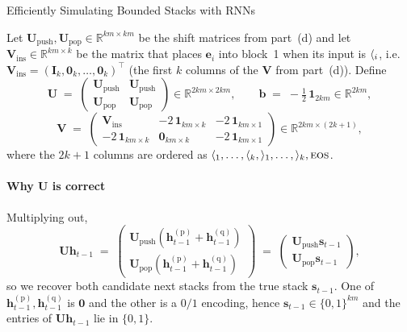 \begin{question}{Efficiently Simulating Bounded Stacks with RNNs}
\begin{subquestion}
    Let $\mathbf{U}_{\text{push}}, \mathbf{U}_{\text{pop}} \in \mathbb{R}^{km\times km}$ be the shift matrices from part~(d) and let $\mathbf{V}_{\text{ins}} \in \mathbb{R}^{km \times k}$ be the matrix that places $\mathbf{e}_i$ into block~1 when its input is $\openBr{i}$, i.e.\ $\mathbf{V}_{\text{ins}} = (\mathbf{I}_k, \mathbf{0}_k, \dots, \mathbf{0}_k)^\top$ (the first $k$ columns of the $\mathbf{V}$ from part~(d)).
    Define
    \[
        \mathbf{U} \;=\; \begin{pmatrix} \mathbf{U}_{\text{push}} & \mathbf{U}_{\text{push}} \\ \mathbf{U}_{\text{pop}} & \mathbf{U}_{\text{pop}} \end{pmatrix} \in \mathbb{R}^{2km \times 2km},
        \qquad
        \mathbf{b} \;=\; -\tfrac{1}{2}\,\mathbf{1}_{2km} \in \mathbb{R}^{2km},
    \]
    \[
        \mathbf{V} \;=\;
        \begin{pmatrix}
            \mathbf{V}_{\text{ins}} & -2\,\mathbf{1}_{km \times k} & -2\,\mathbf{1}_{km \times 1} \\[2pt]
            -2\,\mathbf{1}_{km \times k} & \mathbf{0}_{km \times k} & -2\,\mathbf{1}_{km \times 1}
        \end{pmatrix} \in \mathbb{R}^{2km \times (2k+1)},
    \]
    where the $2k+1$ columns are ordered as $\openBr{1}, \dots, \openBr{k}, \closeBr{1}, \dots, \closeBr{k}, \eos$.

    \paragraph{Why $\mathbf{U}$ is correct} Multiplying out,
    \[
        \mathbf{U}\mathbf{h}_{t-1} \;=\; \begin{pmatrix} \mathbf{U}_{\text{push}}(\mathbf{h}_{t-1}^{(\text{p})} + \mathbf{h}_{t-1}^{(\text{q})}) \\ \mathbf{U}_{\text{pop}}(\mathbf{h}_{t-1}^{(\text{p})} + \mathbf{h}_{t-1}^{(\text{q})}) \end{pmatrix} \;=\; \begin{pmatrix} \mathbf{U}_{\text{push}}\mathbf{s}_{t-1} \\ \mathbf{U}_{\text{pop}}\mathbf{s}_{t-1} \end{pmatrix},
    \]
    so we recover both candidate next stacks from the true stack $\mathbf{s}_{t-1}$. 
    One of $\mathbf{h}_{t-1}^{(\text{p})}, \mathbf{h}_{t-1}^{(\text{q})}$ is $\mathbf{0}$ and the other is a $0/1$ encoding, hence $\mathbf{s}_{t-1} \in \{0, 1\}^{km}$ and the entries of $\mathbf{U}\mathbf{h}_{t-1}$ lie in $\{0, 1\}$.


\end{subquestion}
\end{question}
